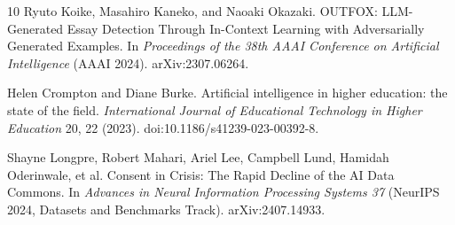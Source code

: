 \documentclass[sigconf,nonacm]{acmart}
\begin{document}
\begin{thebibliography}{10}
Ryuto Koike, Masahiro Kaneko, and Naoaki Okazaki.
\newblock OUTFOX: LLM-Generated Essay Detection Through In-Context Learning with Adversarially Generated Examples.
\newblock In \emph{Proceedings of the 38th AAAI Conference on Artificial Intelligence} (AAAI 2024). arXiv:2307.06264.

Helen Crompton and Diane Burke.
\newblock Artificial intelligence in higher education: the state of the field.
\newblock \emph{International Journal of Educational Technology in Higher Education} 20, 22 (2023). doi:10.1186/s41239-023-00392-8.

Shayne Longpre, Robert Mahari, Ariel Lee, Campbell Lund, Hamidah Oderinwale, et al.
\newblock Consent in Crisis: The Rapid Decline of the AI Data Commons.
\newblock In \emph{Advances in Neural Information Processing Systems 37} (NeurIPS 2024, Datasets and Benchmarks Track). arXiv:2407.14933.

\end{thebibliography}
\end{document}
